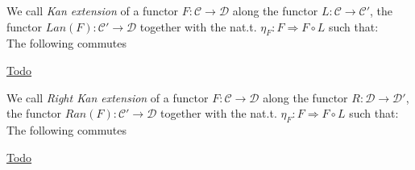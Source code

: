 \documentclass[preview]{standalone}
\begin{document}
%
\begin{minipage}[t]{0.5\textwidth}
\begin{definition}
We call \emph{Kan extension} of a functor $F:\mathcal{C}\rightarrow\mathcal{D}$ along the functor $L:\mathcal{C} \rightarrow \mathcal{C}'$, 
	the functor $Lan(F):\mathcal{C}'\rightarrow \mathcal{D}$
	together with the nat.t. $\eta_F: F \Rightarrow F\circ L$ such that:\\
	The following commutes

	\href{https://ncatlab.org/nlab/show/Kan+extension#OrdinaryKanExtensions}{Todo}
\end{definition}
\end{minipage}
\begin{minipage}[t]{0.5\textwidth}
\begin{definition}
We call \emph{Right Kan extension} of a functor $F:\mathcal{C}\rightarrow\mathcal{D}$ along the functor $R:\mathcal{D} \rightarrow \mathcal{D}'$, 
	the functor $Ran(F):\mathcal{C}'\rightarrow \mathcal{D}$
	together with the nat.t. $\eta_F: F \Rightarrow F\circ L$ such that:\\
	The following commutes
	\href{https://ncatlab.org/nlab/show/Kan+extension#OrdinaryKanExtensions}{Todo}
\end{definition}
\end{minipage}
\end{document}
